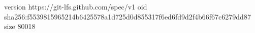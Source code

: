version https://git-lfs.github.com/spec/v1
oid sha256:f5539815965214b6425578a1d725d0d855317f6ed6fd9d2f4b66f67c6279dd87
size 80018

